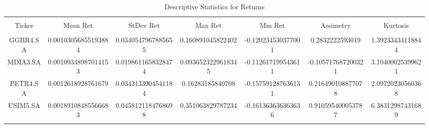 
\begin{table}[!htbp] \centering 
  \caption{Descriptive Statistics for Returns} 
  \label{tab:DescRetStats_stargazer} 
\footnotesize 
\begin{tabular}{@{\extracolsep{5pt}} ccccccc} 
\\[-1.8ex]\hline \\[-1.8ex] 
Ticker & Mean Ret & StDev Ret & Max Ret & Min Ret & Assimetry & Kurtosis \\ 
\hline 
\hline \\[-1.8ex] 
GGBR4.SA & 0.00103056855193884 & 0.0340547967885655 & 0.160891045822402 & -0.120234530377001 & 0.2832222593019 & 1.39233434118844 \\ 
MDIA3.SA & 0.00109348987014153 & 0.0198611658328474 & 0.0936523229618345 & -0.112617199543611 & -0.105717687200321 & 3.10400025399621 \\ 
PETR4.SA & 0.0012618928761679 & 0.0343133904541184 & 0.16283185840708 & -0.157591287636131 & 0.216490108877078 & 2.09720230560368 \\ 
USIM5.SA & 0.00189108485566683 & 0.0458121184768698 & 0.351063829787234 & -0.161363636363636 & 0.910595400053787 & 6.38312987431689 \\ 
\hline 
\hline \\[-1.8ex] 
\end{tabular} 
\end{table} 
